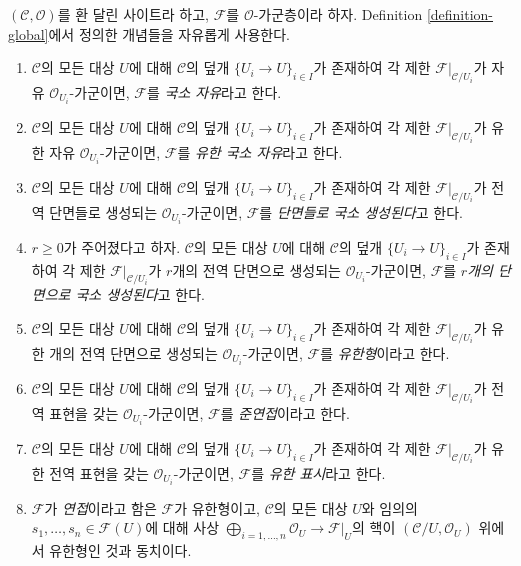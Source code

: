 \begin{definition}
\label{definition-site-local}
$(\mathcal{C}, \mathcal{O})$를 환 달린 사이트라 하고, $\mathcal{F}$를
$\mathcal{O}$-가군층이라 하자. Definition \ref{definition-global}에서
정의한 개념들을 자유롭게 사용한다.
\begin{enumerate}
\item $\mathcal{C}$의 모든 대상 $U$에 대해 $\mathcal{C}$의 덮개
$\{U_i \to U\}_{i \in I}$가 존재하여 각 제한
$\mathcal{F}|_{\mathcal{C}/U_i}$가 자유 $\mathcal{O}_{U_i}$-가군이면,
$\mathcal{F}$를 {\it 국소 자유}라고 한다.
\item $\mathcal{C}$의 모든 대상 $U$에 대해 $\mathcal{C}$의 덮개
$\{U_i \to U\}_{i \in I}$가 존재하여 각 제한
$\mathcal{F}|_{\mathcal{C}/U_i}$가 유한 자유 $\mathcal{O}_{U_i}$-가군이면,
$\mathcal{F}$를 {\it 유한 국소 자유}라고 한다.
\item $\mathcal{C}$의 모든 대상 $U$에 대해 $\mathcal{C}$의 덮개
$\{U_i \to U\}_{i \in I}$가 존재하여 각 제한
$\mathcal{F}|_{\mathcal{C}/U_i}$가 전역 단면들로 생성되는
$\mathcal{O}_{U_i}$-가군이면, $\mathcal{F}$를 {\it 단면들로 국소 생성된다}고
한다.
\item $r \geq 0$가 주어졌다고 하자. $\mathcal{C}$의 모든 대상 $U$에 대해
$\mathcal{C}$의 덮개 $\{U_i \to U\}_{i \in I}$가 존재하여 각 제한
$\mathcal{F}|_{\mathcal{C}/U_i}$가 $r$개의 전역 단면으로 생성되는
$\mathcal{O}_{U_i}$-가군이면, $\mathcal{F}$를 {\it $r$개의 단면으로 국소
생성된다}고 한다.
\item $\mathcal{C}$의 모든 대상 $U$에 대해 $\mathcal{C}$의 덮개
$\{U_i \to U\}_{i \in I}$가 존재하여 각 제한
$\mathcal{F}|_{\mathcal{C}/U_i}$가 유한 개의 전역 단면으로 생성되는
$\mathcal{O}_{U_i}$-가군이면, $\mathcal{F}$를 {\it 유한형}이라고 한다.
\item $\mathcal{C}$의 모든 대상 $U$에 대해 $\mathcal{C}$의 덮개
$\{U_i \to U\}_{i \in I}$가 존재하여 각 제한
$\mathcal{F}|_{\mathcal{C}/U_i}$가 전역 표현을 갖는
$\mathcal{O}_{U_i}$-가군이면, $\mathcal{F}$를 {\it 준연접}이라고 한다.
\item $\mathcal{C}$의 모든 대상 $U$에 대해 $\mathcal{C}$의 덮개
$\{U_i \to U\}_{i \in I}$가 존재하여 각 제한
$\mathcal{F}|_{\mathcal{C}/U_i}$가 유한 전역 표현을 갖는
$\mathcal{O}_{U_i}$-가군이면, $\mathcal{F}$를 {\it 유한 표시}라고 한다.
\item $\mathcal{F}$가 {\it 연접}이라고 함은 $\mathcal{F}$가 유한형이고,
$\mathcal{C}$의 모든 대상 $U$와 임의의
$s_1, \ldots, s_n \in \mathcal{F}(U)$에 대해 사상
$\bigoplus_{i = 1, \ldots, n} \mathcal{O}_U \to \mathcal{F}|_U$의 핵이
$(\mathcal{C}/U, \mathcal{O}_U)$ 위에서 유한형인 것과 동치이다.
\end{enumerate}
\end{definition}

